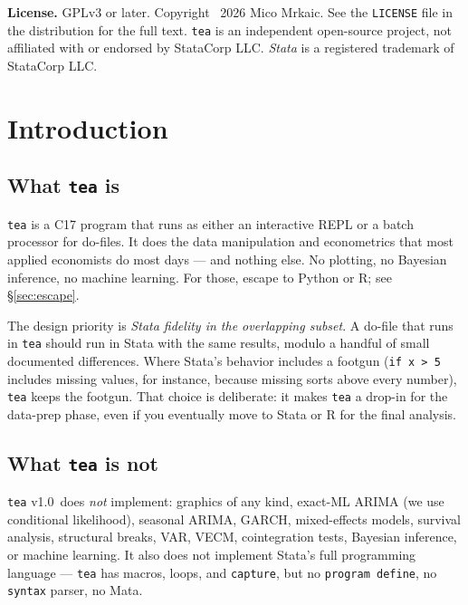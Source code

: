 \documentclass[11pt,letterpaper]{article}
\newcommand{\teaversion}{1.0}
\begin{document}
\begin{center}
\begin{minipage}{0.85\textwidth}
\vspace{1em}
\textbf{License.}  GPLv3 or later.  Copyright \textcopyright\ 2026
Mico Mrkaic.  See the \texttt{LICENSE} file in the distribution for
the full text.  \texttt{tea} is an independent open-source project,
not affiliated with or endorsed by StataCorp LLC.
\textit{Stata} is a registered trademark of StataCorp LLC.
\end{minipage}
\end{center}

\vspace{2em}

\newpage
\tableofcontents
\newpage

\section{Introduction}

\subsection{What \texttt{tea} is}

\texttt{tea} is a C17 program that runs as either an interactive REPL or
a batch processor for do-files.  It does the data manipulation and
econometrics that most applied economists do most days — and nothing
else.  No plotting, no Bayesian inference, no machine learning.  For
those, escape to Python or R; see \S\ref{sec:escape}.

The design priority is \emph{Stata fidelity in the overlapping subset}.
A do-file that runs in \texttt{tea} should run in Stata with the same
results, modulo a handful of small documented differences.  Where
Stata's behavior includes a footgun (\texttt{if x > 5} includes missing
values, for instance, because missing sorts above every number),
\texttt{tea} keeps the footgun.  That choice is deliberate: it makes
\texttt{tea} a drop-in for the data-prep phase, even if you eventually
move to Stata or R for the final analysis.

\subsection{What \texttt{tea} is not}

\texttt{tea} v\teaversion\ does \emph{not} implement: graphics of any
kind, exact-ML ARIMA (we use conditional likelihood), seasonal ARIMA,
GARCH, mixed-effects models, survival analysis, structural breaks, VAR,
VECM, cointegration tests, Bayesian inference, or machine learning.  It
also does not implement Stata's full programming language — \texttt{tea}
has macros, loops, and \texttt{capture}, but no \texttt{program define},
no \texttt{syntax} parser, no Mata.
\end{document}
